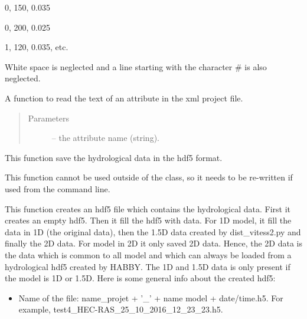\documentclass[letterpaper,10pt,english]{sphinxmanual}
\begin{document}
\begin{fulllineitems}
\begin{fulllineitems}
0, 150, 0.035

0, 200, 0.025

1, 120, 0.035, etc.

White space is neglected and a line starting with the character \# is also neglected.

\end{fulllineitems}


\begin{fulllineitems}
\label{\detokenize{index:src_GUI.hydro_GUI_2.SubHydroW.read_attribute_xml}}
A function to read the text of an attribute in the xml project file.
\begin{quote}\begin{description}
\item[{Parameters}] \leavevmode
{} -- the attribute name (string).

\end{description}\end{quote}

\end{fulllineitems}


\begin{fulllineitems}
\label{\detokenize{index:src_GUI.hydro_GUI_2.SubHydroW.save_hdf5}}
This function save the hydrological data in the hdf5 format.


This function cannot be used outside of the class, so it needs to be re-written if used from the command line.

This function creates an hdf5 file which contains the hydrological data. First it creates an empty hdf5.
Then it fill the hdf5 with data. For 1D model, it fill the data in 1D (the original data), then the 1.5D data
created by dist\_vitess2.py and finally the 2D data. For model in 2D it only saved 2D data. Hence, the 2D data
is the data which is common to all model and which can always be loaded from a hydrological hdf5 created by
HABBY. The 1D and 1.5D data is only present if the model is 1D or 1.5D. Here is some general info about the
created hdf5:
\begin{itemize}
\item {} 
Name of the file: name\_projet  +  ’\_’ +  name model + date/time.h5.  For example, test4\_HEC-RAS\_25\_10\_2016\_12\_23\_23.h5.


\end{itemize}
\end{fulllineitems}
\end{fulllineitems}
\end{document}
